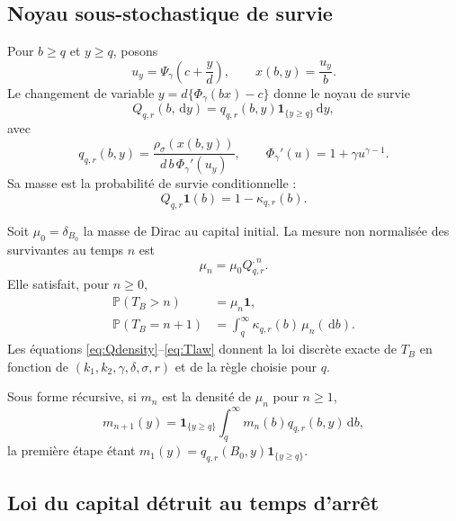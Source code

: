 \documentclass[11pt,a4paper]{article}
\newcommand{\Pp}{\mathbb P}
\newcommand{\1}{\mathbf 1}
\newcommand{\dd}{\,\mathrm d}
\theoremstyle{definition}
\theoremstyle{remark}
\begin{document}
\subsection{Noyau sous-stochastique de survie}

Pour $b\geq q$ et $y\geq q$, posons
\begin{equation}
u_y=\Psi_\gamma\!\left(c+\frac yd\right),
\qquad x(b,y)=\frac{u_y}{b}.
\label{eq:change-borrower}
\end{equation}
Le changement de variable
$y=d\{\Phi_\gamma(bx)-c\}$ donne le noyau de survie
\begin{equation}
Q_{q,r}(b,\dd y)=q_{q,r}(b,y)\1_{\{y\geq q\}}\dd y,
\label{eq:Q}
\end{equation}
avec
\begin{equation}
q_{q,r}(b,y)=
\frac{\rho_\sigma(x(b,y))}
{d\,b\,\Phi_\gamma'(u_y)},
\qquad
\Phi_\gamma'(u)=1+\gamma u^{\gamma-1}.
\label{eq:Qdensity}
\end{equation}
Sa masse est la probabilité de survie conditionnelle :
\begin{equation}
Q_{q,r}\1(b)=1-\kappa_{q,r}(b).
\label{eq:Qmass}
\end{equation}

Soit $\mu_0=\delta_{B_0}$ la masse de Dirac au capital initial. La mesure
non normalisée des survivantes au temps $n$ est
\begin{equation}
\mu_n=\mu_0Q_{q,r}^{,n}.
\label{eq:mun}
\end{equation}
Elle satisfait, pour $n\geq0$,
\begin{align}
\Pp(T_B>n)&=\mu_n\1,
\label{eq:survival-law}\\
\Pp(T_B=n+1)&=\int_q^\infty \kappa_{q,r}(b)\,\mu_n(\dd b).
\label{eq:Tlaw}
\end{align}
Les équations \eqref{eq:Qdensity}--\eqref{eq:Tlaw} donnent la loi discrète
exacte de $T_B$ en fonction de
$(k_1,k_2,\gamma,\delta,\sigma,r)$ et de la règle choisie pour $q$.

Sous forme récursive, si $m_n$ est la densité de $\mu_n$ pour $n\geq1$,
\begin{equation}
m_{n+1}(y)=\1_{\{y\geq q\}}
\int_q^\infty m_n(b)q_{q,r}(b,y)\dd b,
\label{eq:density-recursion}
\end{equation}
la première étape étant
$m_1(y)=q_{q,r}(B_0,y)\1_{\{y\geq q\}}$.

\subsection{Loi du capital détruit au temps d'arrêt}
\end{document}
